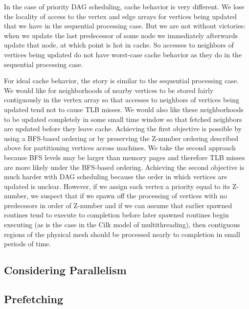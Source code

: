 In the case of priority DAG scheduling, cache behavior is very different. We lose the locality of access to the vertex and edge arrays for vertices being updated that we have in the sequential processing case. But we are not without victories: when we update the last predecessor of some node we immediately afterwards update that node, at which point is hot in cache. So accesses to neighbors of vertices being updated do not have worst-case cache behavior as they do in the sequential processing case.

For ideal cache behavior, the story is similar to the sequential processing case. We would like for neighborhoods of nearby vertices to be stored fairly contiguously in the vertex array so that accesses to neighbors of vertices being updated tend not to cause TLB misses. We would also like these neighborhoods to be updated completely in some small time window so that fetched neighbors are updated before they leave cache. Achieving the first objective is possible by using a BFS-based ordering or by preserving the Z-number ordering described above for partitioning vertices across machines. We take the second approach because BFS levels may be larger than memory pages and therefore TLB misses are more likely under the BFS-based ordering. Achieving the second objective is much harder with DAG scheduling because the order in which vertices are updated is unclear. However, if we assign each vertex a priority equal to its Z-number, we suspect that if we spawn off the processing of vertices with no predecssors in order of Z-number and if we can assume that earlier spawned routines tend to execute to completion before later spawned routines begin executing (as is the case in the Cilk model of multithreading), then contiguous regions of the physical mesh should be processed nearly to completion in small periods of time. 



\subsection{Considering Parallelism}

\subsection{Prefetching}
